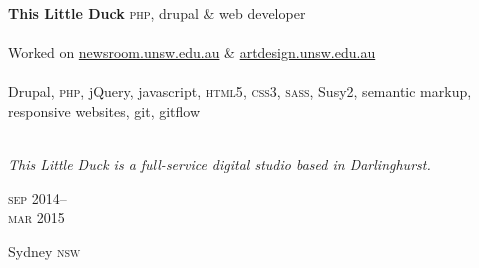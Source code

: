 
\begin{minipage}[t]{0.75\textwidth}
\textbf{This Little Duck}\phantom{..} \textsc{php}, drupal \& web developer \\
\\
Worked on \href{https://newsroom.unsw.edu.au/}{newsroom.unsw.edu.au} 
\& \href{https://artdesign.unsw.edu.au/}{artdesign.unsw.edu.au} 
\\
\\
Drupal, \textsc{php}, jQuery, javascript, \textsc{html5}, 
\textsc{css3}, \textsc{sass}, Susy2, semantic markup, responsive websites,
git, gitflow
\\
\\
{\small
\textit{This Little Duck is a full-service digital studio based in Darlinghurst.}
\par}
\end{minipage}
\begin{minipage}[t]{0.25\textwidth}
{
\hfill \textsc{sep} 2014--\\ 
\hspace*{0pt} \hfill \textsc{mar} 2015
\par
{\small\hfill Sydney \textsc{nsw}}
}
\end{minipage}


